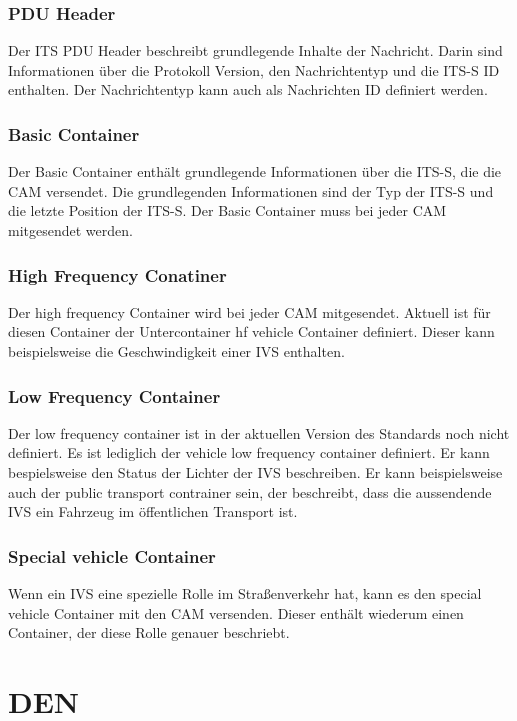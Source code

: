 \subsubsection{PDU Header \label{facilitylayer_PduHeader}}
Der \ac{ITS} \ac{PDU} Header beschreibt grundlegende Inhalte der Nachricht. Darin sind Informationen über die Protokoll Version, den Nachrichtentyp und die \ac{ITS-S} \ac{ID} enthalten. Der Nachrichtentyp kann auch als Nachrichten \ac{ID} definiert werden. 


\subsubsection{Basic Container}
Der Basic Container enthält grundlegende Informationen über die \ac{ITS-S}, die die \ac{CAM} versendet. Die grundlegenden Informationen sind der Typ der \ac{ITS-S} und die letzte Position der \ac{ITS-S}. Der Basic Container muss bei jeder \ac{CAM} mitgesendet werden.

\subsubsection{High Frequency Conatiner}
Der high frequency Container wird bei jeder \ac{CAM} mitgesendet. Aktuell ist für diesen Container der Untercontainer hf vehicle Container definiert. Dieser kann beispielsweise die Geschwindigkeit einer \ac{IVS} enthalten. 


\subsubsection{Low Frequency Container}
Der low frequency container ist in der aktuellen Version des Standards \cite{en302637-2} noch nicht definiert. Es ist lediglich der vehicle low frequency container definiert. Er kann bespielsweise den Status der Lichter der \ac{IVS} beschreiben. Er kann beispielsweise auch der public transport contrainer sein, der beschreibt, dass die aussendende \ac{IVS} ein Fahrzeug im öffentlichen Transport ist.

\subsubsection{Special vehicle Container}
Wenn ein \ac{IVS} eine spezielle Rolle im Straßenverkehr hat, kann es den special vehicle Container mit den \ac{CAM} versenden. Dieser enthält wiederum einen Container, der diese Rolle genauer beschriebt. 

\section{DEN\label{sec:den}}

